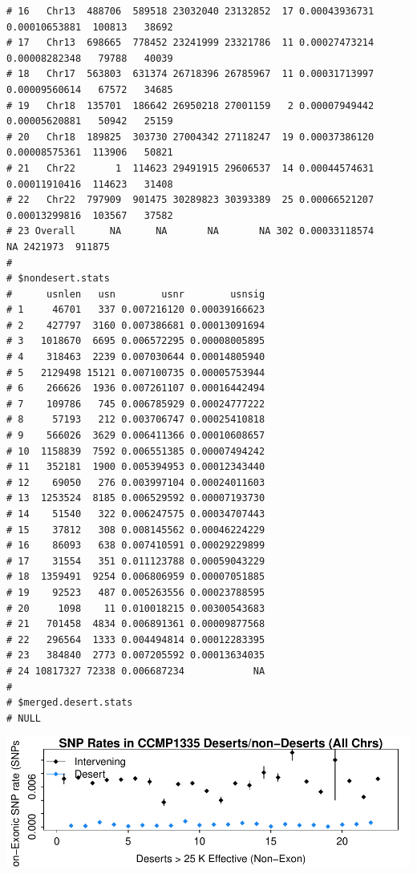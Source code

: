 \documentclass{article}\usepackage[]{graphicx}\usepackage[]{color}
\makeatletter
\newenvironment{kframe}{%
 \def\at@end@of@kframe{}%
 \ifinner\ifhmode%
  \def\at@end@of@kframe{\end{minipage}}%
  \begin{minipage}{\columnwidth}%
 \fi\fi%
 \def\FrameCommand##1{\hskip\@totalleftmargin \hskip-\fboxsep
 \colorbox{shadecolor}{##1}\hskip-\fboxsep
     \hskip-\linewidth \hskip-\@totalleftmargin \hskip\columnwidth}%
 \MakeFramed {\advance\hsize-\width
   \@totalleftmargin\z@ \linewidth\hsize
   \@setminipage}}%
 {\par\unskip\endMakeFramed%
 \at@end@of@kframe}
\newenvironment{knitrout}{}{} %
\makeatother
\begin{document}
\begin{knitrout}
\begin{kframe}
\begin{verbatim}
# 16   Chr13  488706  589518 23032040 23132852  17 0.00043936731 0.00010653881  100813   38692
# 17   Chr13  698665  778452 23241999 23321786  11 0.00027473214 0.00008282348   79788   40039
# 18   Chr17  563803  631374 26718396 26785967  11 0.00031713997 0.00009560614   67572   34685
# 19   Chr18  135701  186642 26950218 27001159   2 0.00007949442 0.00005620881   50942   25159
# 20   Chr18  189825  303730 27004342 27118247  19 0.00037386120 0.00008575361  113906   50821
# 21   Chr22       1  114623 29491915 29606537  14 0.00044574631 0.00011910416  114623   31408
# 22   Chr22  797909  901475 30289823 30393389  25 0.00066521207 0.00013299816  103567   37582
# 23 Overall      NA      NA       NA       NA 302 0.00033118574            NA 2421973  911875
# 
# $nondesert.stats
#      usnlen   usn        usnr        usnsig
# 1     46701   337 0.007216120 0.00039166623
# 2    427797  3160 0.007386681 0.00013091694
# 3   1018670  6695 0.006572295 0.00008005895
# 4    318463  2239 0.007030644 0.00014805940
# 5   2129498 15121 0.007100735 0.00005753944
# 6    266626  1936 0.007261107 0.00016442494
# 7    109786   745 0.006785929 0.00024777222
# 8     57193   212 0.003706747 0.00025410818
# 9    566026  3629 0.006411366 0.00010608657
# 10  1158839  7592 0.006551385 0.00007494242
# 11   352181  1900 0.005394953 0.00012343440
# 12    69050   276 0.003997104 0.00024011603
# 13  1253524  8185 0.006529592 0.00007193730
# 14    51540   322 0.006247575 0.00034707443
# 15    37812   308 0.008145562 0.00046224229
# 16    86093   638 0.007410591 0.00029229899
# 17    31554   351 0.011123788 0.00059043229
# 18  1359491  9254 0.006806959 0.00007051885
# 19    92523   487 0.005263556 0.00023788595
# 20     1098    11 0.010018215 0.00300543683
# 21   701458  4834 0.006891361 0.00009877568
# 22   296564  1333 0.004494814 0.00012283395
# 23   384840  2773 0.007205592 0.00013634035
# 24 10817327 72338 0.006687234            NA
# 
# $merged.desert.stats
# NULL
\end{verbatim}
\end{kframe}
\end{knitrout}

\includegraphics{figs-mine/bigdes-snpdens-nc-ny.pdf}
\end{document}
